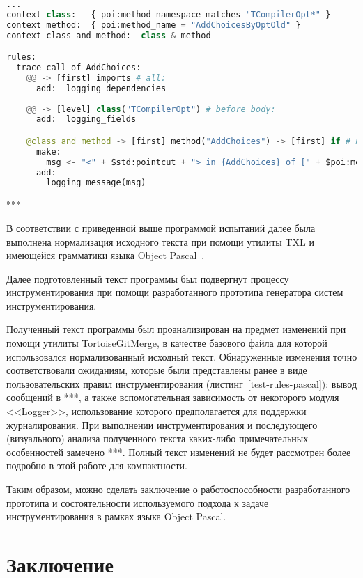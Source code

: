 \begin{lstlisting}[frame=single, language=Python, label={test-rules-pascal}, caption={Описание правил инструментирования. Object Pascal-проект.}]
...
context class:   { poi:method_namespace matches "TCompilerOpt*" }
context method:  { poi:method_name = "AddChoicesByOptOld" }
context class_and_method:  class & method

rules:
  trace_call_of_AddChoices:
    @@ -> [first] imports # all:
      add:  logging_dependencies
  
    @@ -> [level] class("TCompilerOpt") # before_body:
      add:  logging_fields

    @class_and_method -> [first] method("AddChoices") -> [first] if # before:
      make:
        msg <- "<" + $std:pointcut + "> in {AddChoices} of [" + $poi:method_name_full + "] method";
      add:
        logging_message(msg)
\end{lstlisting}

***

В соответствии с приведенной выше программой испытаний далее была выполнена нормализация исходного текста при помощи утилиты TXL и имеющейся грамматики языка Object Pascal~\cite{txl-resources}.

Далее подготовленный текст программы был подвергнут процессу инструментирования при помощи разработанного прототипа генератора систем инструментирования.

Полученный текст программы был проанализирован на предмет изменений при помощи утилиты TortoiseGitMerge, в качестве базового файла для которой использовался нормализованный исходный текст.
Обнаруженные изменения точно соответствовали ожиданиям, которые были представлены ранее в виде пользовательских правил инструментирования (листинг~\ref{test-rules-pascal}):
вывод сообщений в ***,
а также вспомогательная зависимость от некоторого модуля <<Logger>>, использование которого предполагается для поддержки журналирования.
При выполнении инструментирования и последующего (визуального) анализа полученного текста каких-либо примечательных особенностей замечено ***.
Полный текст изменений не будет рассмотрен более подробно в этой работе для компактности.

Таким образом, можно сделать заключение о работоспособности разработанного прототипа и состоятельности используемого подхода к задаче инструментирования в рамках языка Object Pascal.

\section{Заключение}

